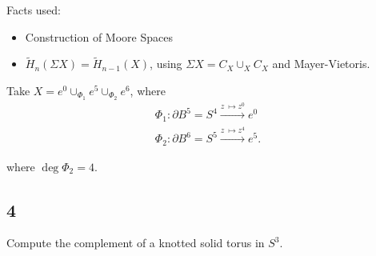 \begin{solution}

Facts used:

\begin{itemize}
\tightlist
\item
  Construction of Moore Spaces
\item
  \(\tilde H_n(\Sigma X) = \tilde H_{n-1}(X)\), using
  \(\Sigma X = C_X \cup_X C_X\) and Mayer-Vietoris.
\end{itemize}

Take \(X = e^0 \cup_{\Phi_1} e^5 \cup_{\Phi_2} e^6\), where
\begin{align*} \Phi_1: {\partial}B^5 = S^4 \xrightarrow{z~\mapsto z^0} e^0 \\ \Phi_2: {\partial}B^6 = S^5 \xrightarrow{z~\mapsto z^4} e^5 .\end{align*}

where \(\deg \Phi_2 = 4\).

\end{solution}

\hypertarget{section-8}{%
\subsection{4}\label{section-8}}

Compute the complement of a knotted solid torus in \(S^3\).

